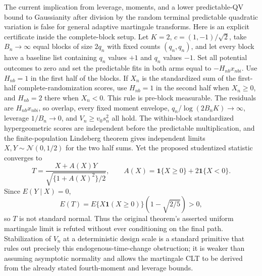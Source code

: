 The current implication from leverage, moments, and a lower predictable-QV bound to Gaussianity after division by the random terminal predictable quadratic variation is false for general adaptive martingale transforms.  Here is an explicit certificate inside the complete-block setup.  Let \(K=2\), \(c=(1,-1)/\sqrt2\), take \(B_n\to\infty\) equal blocks of size \(2q_n\) with fixed counts \((q_n,q_n)\), and let every block have a baseline list containing \(q_n\) values \(+1\) and \(q_n\) values \(-1\).  Set all potential outcomes to zero and set the predictable fits in both arms equal to \(-H_{nb}x_{nbi}\).  Use \(H_{nb}=1\) in the first half of the blocks.  If \(X_n\) is the standardized sum of the first-half complete-randomization scores, use \(H_{nb}=1\) in the second half when \(X_n\ge0\), and \(H_{nb}=2\) there when \(X_n<0\).  This rule is pre-block measurable.  The residuals are \(H_{nb}x_{nbi}\), so overlap, every fixed moment envelope, \(q_n/\log(2B_nK)\to\infty\), leverage \(1/B_n\to0\), and \(V_n\ge v_0s_n^2\) all hold.  The within-block standardized hypergeometric scores are independent before the predictable multiplication, and the finite-population Lindeberg theorem gives independent limits \(X,Y\sim\mathcal N(0,1/2)\) for the two half sums.  Yet the proposed studentized statistic converges to
\[
 T=\frac{X+A(X)Y}{\sqrt{\{1+A(X)^2\}/2}},\qquad A(X)=\mathbf 1\{X\ge0\}+2\mathbf 1\{X<0\}.
\]
Since \(E(Y\mid X)=0\),
\[
 E(T)=E\{X\mathbf 1(X\ge0)\}\left(1-\sqrt{2/5}\right)>0,
\]
so \(T\) is not standard normal.  Thus the original theorem's asserted uniform martingale limit is refuted without ever conditioning on the final path.  Stabilization of \(V_n\) at a deterministic design scale is a standard primitive that rules out precisely this endogenous-time-change obstruction; it is weaker than assuming asymptotic normality and allows the martingale CLT to be derived from the already stated fourth-moment and leverage bounds.